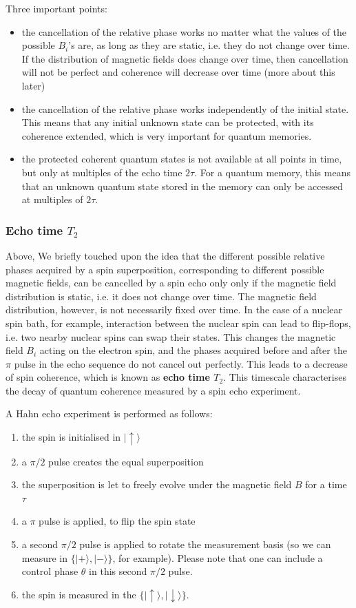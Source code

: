 \documentclass[a4paper,11pt]{article}
\newcommand{\ket}[1]{| #1 \rangle}
\begin{document}
Three important points:
\begin{itemize}
    \item the cancellation of the relative phase works no matter what the values of the possible $B_i$'s are, as long as they are static, i.e. they do not change over time. If the distribution of magnetic fields does change over time, then cancellation will not be perfect and coherence will decrease over time (more about this later)
    \item the cancellation of the relative phase works independently of the initial state. This means that any initial unknown state can be protected, with its coherence extended, which is very important for quantum memories.
    \item the protected coherent quantum states is not available at all points in time, but only at multiples of the echo time  $2\tau$. For a quantum memory, this means that an unknown quantum state stored in the memory can only  be accessed at multiples of $2\tau$.
\end{itemize}

\subsubsection{Echo time $T_2$}
Above, We briefly touched upon the idea that the different possible relative phases acquired by a spin superposition, corresponding to different possible magnetic fields, can be cancelled by a spin echo only only if the magnetic field distribution is static, i.e. it does not change over time.
\newline The magnetic field distribution, however, is not necessarily fixed over time. In the case of a nuclear spin bath, for example, interaction between the nuclear spin can lead to flip-flops, i.e. two nearby nuclear spins can swap their states. This changes the magnetic field $B_i$ acting on the electron spin, and the phases acquired before and after the $\pi$ pulse in the echo sequence do not cancel out perfectly.
\newline This leads to a decrease of spin coherence, which is known as {\bf echo time $T_2$}. This timescale characterises the decay of quantum coherence measured by a spin echo experiment.

A Hahn echo experiment is performed as follows:
\begin{enumerate}
\item the spin is initialised in $\ket{\uparrow}$
\item a $\pi/2$ pulse creates the equal superposition
\item the superposition is let to freely evolve under the magnetic field $B$ for a time $\tau$
\item a $\pi$ pulse is applied, to flip the spin state
\item a second $\pi/2$ pulse is applied to rotate the measurement basis (so we can measure in $\lbrace \ket{+}, \ket{-} \rbrace$, for example). Please note that one can include a control phase $\theta$ in this second $\pi/2$ pulse.
\item the spin is measured in the $\lbrace \ket{\uparrow}, \ket{\downarrow} \rbrace$. 
\end{enumerate}
\end{document}
